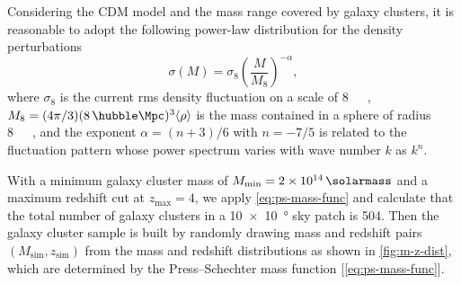 \documentclass[twocolumn]{aastex62}
\newcommand{\R}[1]{\mathrm{#1}}
\begin{document}
Considering the CDM model and the mass range covered by galaxy clusters,
it is reasonable to adopt the following power-law distribution for the
density perturbations \citep{randall2002,sarazin2002}
\begin{equation}
  \label{eq:sigma-mass}
  \sigma(M) = \sigma_8 \left( \frac{M}{M_8} \right)^{-\alpha},
\end{equation}
where $\sigma_8$ is the current rms density fluctuation on
a scale of \SI{8}{\per\hubble\Mpc},
$M_8 = (4\pi/3)(8 \,\si{\per\hubble\Mpc})^3 \langle{\rho}\rangle$
is the mass contained in a sphere of radius \SI{8}{\per\hubble\Mpc},
and the exponent $\alpha = (n+3)/6$ with $n = -7/5$ \citep{randall2002}
is related to the fluctuation pattern whose power spectrum varies
with wave number $k$ as $k^n$.

With a minimum galaxy cluster mass of
$M_{\R{min}} = \SI{2e14}{\solarmass}$
and a maximum redshift cut at $z_{\R{max}} = 4$,
we apply \autoref{eq:ps-mass-func} and
calculate that the total number of galaxy clusters in a
\SI[product-units=repeat]{10 x 10}{\degree} sky patch is 504.
Then the galaxy cluster sample is built by randomly drawing mass and
redshift pairs $(M_{\R{sim}}, z_{\R{sim}})$ from the
mass and redshift distributions as shown in \autoref{fig:m-z-dist},
which are determined by the Press--Schechter mass function
[\autoref{eq:ps-mass-func}].
\end{document}
